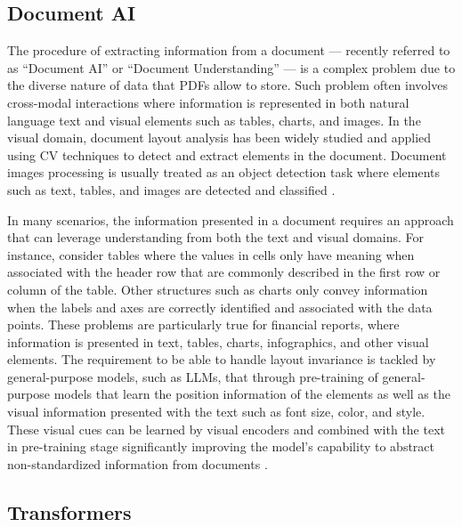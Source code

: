 \documentclass[english, 12pt, a4paper, elec, utf8, a-2b, online]{aaltothesis}
\begin{document}
\subsection{Document AI}

The procedure of extracting information from a document --- recently referred to as ``Document AI'' \cite{Cui2021} or ``Document Understanding'' \cite{Nishant2020} --- is a complex problem due to the diverse nature of data that \ac{PDF}s allow to store.
Such problem often involves cross-modal interactions where information is represented in both natural language text and visual elements such as tables, charts, and images.
In the visual domain, document layout analysis has been widely studied and applied using \ac{CV} techniques to detect and extract elements in the document.
Document images processing is usually treated as an object detection task where elements such as text, tables, and images are detected and classified \cite{Yang2017, Schreiber2017}.

In many scenarios, the information presented in a document requires an approach that can leverage understanding from both the text and visual domains.
For instance, consider tables where the values in cells only have meaning when associated with the header row that are commonly described in the first row or column of the table.
Other structures such as charts only convey information when the labels and axes are correctly identified and associated with the data points.
These problems are particularly true for financial reports, where information is presented in text, tables, charts, infographics, and other visual elements.
The requirement to be able to handle layout invariance is tackled by general-purpose models, such as \ac{LLM}s, that through pre-training of general-purpose models that learn the position information of the elements as well as the visual information presented with the text such as font size, color, and style.
These visual cues can be learned by visual encoders and combined with the text in pre-training stage significantly improving the model's capability to abstract non-standardized information from documents \cite{Cui2021}.

\subsection{Transformers}
\end{document}
